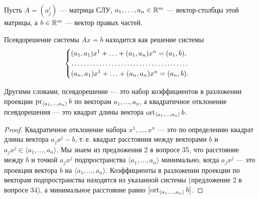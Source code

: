 Пусть $A = (a^i_j)$ --- матрица СЛУ, $a_1, \ldots, a_n \in \mathbb{R}^m$ --- вектор-столбцы этой матрицы, а $b \in \mathbb{R}^m$ --- вектор правых частей.

\begin{theorem}
    Псевдорешение системы $Ax = b$ находится как решение системы
    \[
        \begin{cases}
            (a_1, a_1)x^1 + \ldots + (a_1, a_n)x^n = (a_1, b),\\
            \dotfill\\
            (a_n, a_1)x^1 + \ldots + (a_n, a_n)x^n = (a_n, b).
        \end{cases}
    \]

    Другими словами, псевдорешение --- это набор коэффициентов в разложении проекции $\operatorname{pr}_{\langle a_1, \ldots, a_n\rangle}b$ по векторам $a_1, \ldots, a_n$, а квадратичное отклонение псевдорешения --- это квадрат длины вектора $\operatorname{ort}_{\langle a_1, \ldots, a_n\rangle}b$.
\end{theorem}

\begin{proof}
    Квадратичное отклонение набора $x^1, \ldots, x^n$ --- это по определению квадрат длины вектора $a_jx^j - b$, т.\,е. квадрат расстояния между векторами $b$ и $a_jx^j \in \langle a_1, \ldots, a_n\rangle$. Мы знаем из предложения 2 в вопросе 35, что расстояние между $b$ и точкой $a_jx^j$ подпространства $\langle a_1, \ldots, a_n\rangle$ минимально, когда $a_jx^j$ --- это проекция вектора $b$ на $\langle a_1, \ldots, a_n\rangle$. Коэффициенты в разложении проекции по векторам подпространства находятся из указанной системы (предложение 2 в вопросе 34), а минимальное расстояние равно $\left\lvert\operatorname{ort}_{\langle a_1, \ldots, a_n\rangle}b\right\rvert$.
\end{proof}

